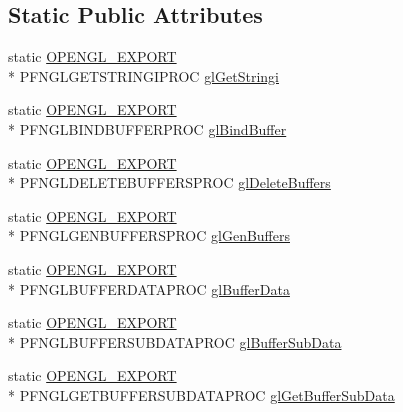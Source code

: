 \subsection*{Static Public Attributes}
\begin{DoxyCompactItemize}
\item 
static \hyperlink{_config_8h_a77401aa3bc0a379879047c1bd30f262e}{O\+P\+E\+N\+G\+L\+\_\+\+E\+X\+P\+O\+R\+T} \\*
P\+F\+N\+G\+L\+G\+E\+T\+S\+T\+R\+I\+N\+G\+I\+P\+R\+O\+C \hyperlink{class_agmd_1_1_g_l_driver_a5603388d49f1e39745fd1b8c8741f419}{gl\+Get\+Stringi}
\item 
static \hyperlink{_config_8h_a77401aa3bc0a379879047c1bd30f262e}{O\+P\+E\+N\+G\+L\+\_\+\+E\+X\+P\+O\+R\+T} \\*
P\+F\+N\+G\+L\+B\+I\+N\+D\+B\+U\+F\+F\+E\+R\+P\+R\+O\+C \hyperlink{class_agmd_1_1_g_l_driver_ae9e9206f66c69bdb81127d17e502d645}{gl\+Bind\+Buffer}
\item 
static \hyperlink{_config_8h_a77401aa3bc0a379879047c1bd30f262e}{O\+P\+E\+N\+G\+L\+\_\+\+E\+X\+P\+O\+R\+T} \\*
P\+F\+N\+G\+L\+D\+E\+L\+E\+T\+E\+B\+U\+F\+F\+E\+R\+S\+P\+R\+O\+C \hyperlink{class_agmd_1_1_g_l_driver_a5c9e5d55d71b02896bad888f23461fc5}{gl\+Delete\+Buffers}
\item 
static \hyperlink{_config_8h_a77401aa3bc0a379879047c1bd30f262e}{O\+P\+E\+N\+G\+L\+\_\+\+E\+X\+P\+O\+R\+T} \\*
P\+F\+N\+G\+L\+G\+E\+N\+B\+U\+F\+F\+E\+R\+S\+P\+R\+O\+C \hyperlink{class_agmd_1_1_g_l_driver_aa4a419a415a3f2f3598c5c50ee404e69}{gl\+Gen\+Buffers}
\item 
static \hyperlink{_config_8h_a77401aa3bc0a379879047c1bd30f262e}{O\+P\+E\+N\+G\+L\+\_\+\+E\+X\+P\+O\+R\+T} \\*
P\+F\+N\+G\+L\+B\+U\+F\+F\+E\+R\+D\+A\+T\+A\+P\+R\+O\+C \hyperlink{class_agmd_1_1_g_l_driver_a72ddf9d5f821b46bc33f0623cd4730d0}{gl\+Buffer\+Data}
\item 
static \hyperlink{_config_8h_a77401aa3bc0a379879047c1bd30f262e}{O\+P\+E\+N\+G\+L\+\_\+\+E\+X\+P\+O\+R\+T} \\*
P\+F\+N\+G\+L\+B\+U\+F\+F\+E\+R\+S\+U\+B\+D\+A\+T\+A\+P\+R\+O\+C \hyperlink{class_agmd_1_1_g_l_driver_a4d441a904aa7d6e20038e1b166c80109}{gl\+Buffer\+Sub\+Data}
\item 
static \hyperlink{_config_8h_a77401aa3bc0a379879047c1bd30f262e}{O\+P\+E\+N\+G\+L\+\_\+\+E\+X\+P\+O\+R\+T} \\*
P\+F\+N\+G\+L\+G\+E\+T\+B\+U\+F\+F\+E\+R\+S\+U\+B\+D\+A\+T\+A\+P\+R\+O\+C \hyperlink{class_agmd_1_1_g_l_driver_a4740735076d7c453a30353366029a9f3}{gl\+Get\+Buffer\+Sub\+Data}

\end{DoxyCompactItemize}
